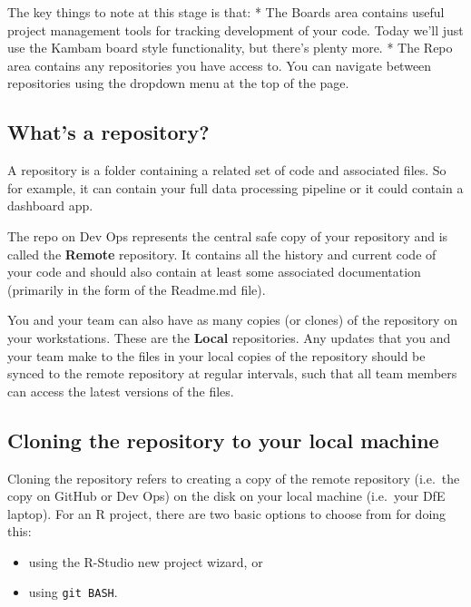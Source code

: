 \documentclass[
  12pt,
]{article}
\providecommand{\tightlist}{%
  \setlength{\itemsep}{0pt}\setlength{\parskip}{0pt}}
\begin{document}
The key things to note at this stage is that: * The Boards area contains
useful project management tools for tracking development of your code.
Today we'll just use the Kambam board style functionality, but there's
plenty more. * The Repo area contains any repositories you have access
to. You can navigate between repositories using the dropdown menu at the
top of the page.

\hypertarget{whats-a-repository}{%
\subsection{What's a repository?}\label{whats-a-repository}}

A repository is a folder containing a related set of code and associated
files. So for example, it can contain your full data processing pipeline
or it could contain a dashboard app.

The repo on Dev Ops represents the central safe copy of your repository
and is called the \textbf{Remote} repository. It contains all the
history and current code of your code and should also contain at least
some associated documentation (primarily in the form of the Readme.md
file).

You and your team can also have as many copies (or clones) of the
repository on your workstations. These are the \textbf{Local}
repositories. Any updates that you and your team make to the files in
your local copies of the repository should be synced to the remote
repository at regular intervals, such that all team members can access
the latest versions of the files.

\hypertarget{cloning-the-repository-to-your-local-machine}{%
\subsection{Cloning the repository to your local
machine}\label{cloning-the-repository-to-your-local-machine}}

Cloning the repository refers to creating a copy of the remote
repository (i.e.~the copy on GitHub or Dev Ops) on the disk on your
local machine (i.e.~your DfE laptop). For an R project, there are two
basic options to choose from for doing this:

\begin{itemize}
\tightlist
\item
  using the R-Studio new project wizard, or
\item
  using \texttt{git\ BASH}.
\end{itemize}
\end{document}

